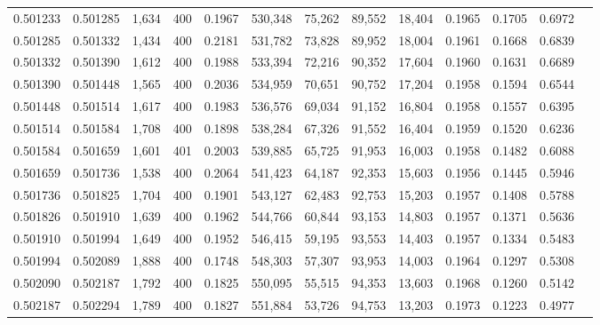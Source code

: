 \begin{tabular}{rrrrrrrrrrrrr}
0.501233 & 0.501285 & 1,634 & 400 &                                     0.1967 & 530,348 &  75,262 &  89,552 &  18,404 & 0.1965 & 0.1705 & 0.6972 \\
0.501285 & 0.501332 & 1,434 & 400 &                                     0.2181 & 531,782 &  73,828 &  89,952 &  18,004 & 0.1961 & 0.1668 & 0.6839 \\
0.501332 & 0.501390 & 1,612 & 400 &                                     0.1988 & 533,394 &  72,216 &  90,352 &  17,604 & 0.1960 & 0.1631 & 0.6689 \\
0.501390 & 0.501448 & 1,565 & 400 &                                     0.2036 & 534,959 &  70,651 &  90,752 &  17,204 & 0.1958 & 0.1594 & 0.6544 \\
0.501448 & 0.501514 & 1,617 & 400 &                                     0.1983 & 536,576 &  69,034 &  91,152 &  16,804 & 0.1958 & 0.1557 & 0.6395 \\
0.501514 & 0.501584 & 1,708 & 400 &                                     0.1898 & 538,284 &  67,326 &  91,552 &  16,404 & 0.1959 & 0.1520 & 0.6236 \\
0.501584 & 0.501659 & 1,601 & 401 &                                     0.2003 & 539,885 &  65,725 &  91,953 &  16,003 & 0.1958 & 0.1482 & 0.6088 \\
0.501659 & 0.501736 & 1,538 & 400 &                                     0.2064 & 541,423 &  64,187 &  92,353 &  15,603 & 0.1956 & 0.1445 & 0.5946 \\
0.501736 & 0.501825 & 1,704 & 400 &                                     0.1901 & 543,127 &  62,483 &  92,753 &  15,203 & 0.1957 & 0.1408 & 0.5788 \\
0.501826 & 0.501910 & 1,639 & 400 &                                     0.1962 & 544,766 &  60,844 &  93,153 &  14,803 & 0.1957 & 0.1371 & 0.5636 \\
0.501910 & 0.501994 & 1,649 & 400 &                                     0.1952 & 546,415 &  59,195 &  93,553 &  14,403 & 0.1957 & 0.1334 & 0.5483 \\
0.501994 & 0.502089 & 1,888 & 400 &                                     0.1748 & 548,303 &  57,307 &  93,953 &  14,003 & 0.1964 & 0.1297 & 0.5308 \\
0.502090 & 0.502187 & 1,792 & 400 &                                     0.1825 & 550,095 &  55,515 &  94,353 &  13,603 & 0.1968 & 0.1260 & 0.5142 \\
0.502187 & 0.502294 & 1,789 & 400 &                                     0.1827 & 551,884 &  53,726 &  94,753 &  13,203 & 0.1973 & 0.1223 & 0.4977 \\

\end{tabular}
